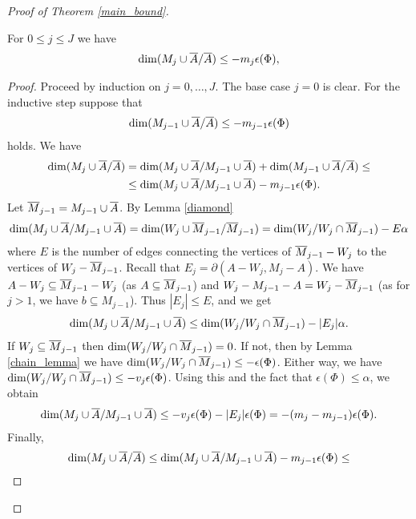 \begin{proof} [Proof of Theorem \ref{main_bound}]
  \begin{Lemma} \label{ubdim_lemma}
    For $0 \leq j \leq J$ we have
    \begin{align*}
      \dim(M_j \cup \overline{A} / \overline{A}) \leq -m_j  \epsilon(\Phi),
    \end{align*}
  \end{Lemma}
  \begin{proof}
    Proceed by induction on $j = 0, \ldots, J$. The base case $j = 0$ is clear.
    For the inductive step suppose that
    \begin{align*}
      \dim(M_{j-1} \cup \overline{A} / \overline{A}) \leq  - m_{j-1}  \epsilon(\Phi)
    \end{align*}
    holds.
    We have
    \begin{align*}
      \dim(M_j \cup \overline{A} / \overline{A}) &= \dim(M_j \cup \overline{A} / M_{j-1} \cup \overline{A}) + \dim(M_{j-1} \cup \overline{A} / \overline{A}) \leq \\
      &\leq \dim(M_j \cup \overline{A} / M_{j-1} \cup \overline{A}) - m_{j-1}  \epsilon(\Phi).
    \end{align*}
    Let ${\overline{M}}_{j-1} = M_{j-1} \cup \overline{A}$.
    By Lemma \ref{diamond}
    \begin{align*}
      \dim(M_j \cup \overline{A} / M_{j-1} \cup \overline{A}) = \dim(W_j \cup {\overline{M}}_{j-1} / {\overline{M}}_{j-1}) = \dim(W_j / W_j \cap {\overline{M}}_{j-1}) - E \alpha
    \end{align*}
    where $E$ is the number of edges connecting the vertices of ${\overline{M}}_{j-1} - W_j$ to the vertices of $W_j - {\overline{M}}_{j-1}$.
    Recall that       $E_j = \partial(A - W_j, M_j - A)$.
    We have $A - W_j \subseteq {\overline{M}}_{j-1} - W_j$ (as $A \subseteq {\overline{M}}_{j-1}$) and $W_j - M_{j-1} - A = W_j - {\overline{M}}_{j-1}$ (as for $j > 1$, we have $b \subseteq M_{j-1}$).
    Thus $|E_j| \leq E$, and we get 
    \begin{align*}
      \dim(M_j \cup \overline{A} / M_{j-1} \cup \overline{A}) \leq \dim(W_j / W_j \cap {\overline{M}}_{j-1}) - |E_j| \alpha.
    \end{align*}
    If $W_j \subseteq {\overline{M}}_{j-1}$ then $\dim(W_j / W_j \cap {\overline{M}}_{j-1}) = 0$.
    If not, then by Lemma \ref{chain_lemma} we have $\dim(W_j / W_j \cap {\overline{M}}_{j-1}) \leq - \epsilon(\Phi)$.
    Either way, we have $\dim(W_j / W_j \cap {\overline{M}}_{j-1}) \leq - v_j \epsilon(\Phi)$.
    Using this and the fact that $\epsilon(\Phi) \leq \alpha$, we obtain
    \begin{align*}
      \dim(M_j \cup \overline{A} / M_{j-1} \cup \overline{A}) \leq - v_j \epsilon(\Phi) - |E_j| \epsilon(\Phi) = -(m_j - m_{j-1})\epsilon(\Phi).
    \end{align*}
    Finally,
    \begin{align*}
      \dim(M_j \cup \BA / \BA) &\leq \dim(M_j \cup \BA / M_{j-1} \cup \BA) - m_{j-1}  \epsilon(\Phi) \leq \\

\end{align*}
\end{proof}
\end{proof}
